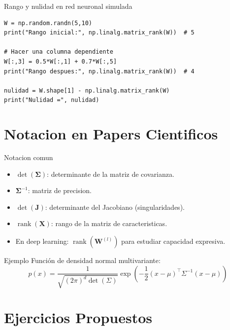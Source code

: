 \documentclass[aspectratio=169, 10pt, xcolor=table]{beamer}
\begin{document}
\begin{frame}[fragile]{Rango y nulidad en red neuronal simulada}
    \begin{lstlisting}
W = np.random.randn(5,10)
print("Rango inicial:", np.linalg.matrix_rank(W))  # 5

# Hacer una columna dependiente
W[:,3] = 0.5*W[:,1] + 0.7*W[:,5]
print("Rango despues:", np.linalg.matrix_rank(W))  # 4

nulidad = W.shape[1] - np.linalg.matrix_rank(W)
print("Nulidad =", nulidad)
    \end{lstlisting}
\end{frame}

\section{Notacion en Papers Cientificos}

\begin{frame}{Notacion comun}
    \begin{itemize}
        \item $\det(\boldsymbol{\Sigma})$: determinante de la matriz de covarianza.
        \item $\boldsymbol{\Sigma}^{-1}$: matriz de precision.
        \item $\det(\mathbf{J})$: determinante del Jacobiano (singularidades).
        \item $\operatorname{rank}(\mathbf{X})$: rango de la matriz de caracteristicas.
        \item En deep learning: $\operatorname{rank}(\mathbf{W}^{(l)})$ para estudiar capacidad expresiva.
    \end{itemize}
    \begin{exampleblock}{Ejemplo}
        Función de densidad normal multivariante:
        \[
        p(x) = \frac{1}{\sqrt{(2\pi)^d \det(\Sigma)}} \exp\left(-\frac{1}{2}(x-\mu)^\top \Sigma^{-1}(x-\mu)\right)
        \]
    \end{exampleblock}
\end{frame}

\section{Ejercicios Propuestos}
\end{document}
